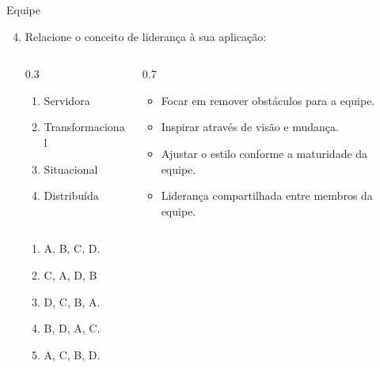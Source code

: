 \documentclass{beamer}
\begin{document}
\begin{frame}{Equipe}
	\begin{enumerate}
		\setcounter{enumi}{3}
		\justifying
		\item Relacione o conceito de liderança à sua aplicação:
		\begin{columns}
			\begin{column}{0.3\textwidth}
				\begin{enumerate}[A]
					\item Servidora
					\item Transformacional
					\item Situacional
					\item Distribuída
				\end{enumerate}
			\end{column}
			\begin{column}{0.7\textwidth}
				\begin{itemize}
					\item Focar em remover obstáculos para a equipe.
					\item Inspirar através de visão e mudança.
					\item Ajustar o estilo conforme a maturidade da equipe.
					\item Liderança compartilhada entre membros da equipe.
				\end{itemize}
			\end{column}
		\end{columns}
		\begin{enumerate}[a]
			\item A, B, C, D.
			\item \alert<2>{C, A, D, B}
			\item D, C, B, A.
			\item B, D, A, C.
			\item A, C, B, D.
		\end{enumerate}
	\end{enumerate}
\end{frame}
\end{document}
